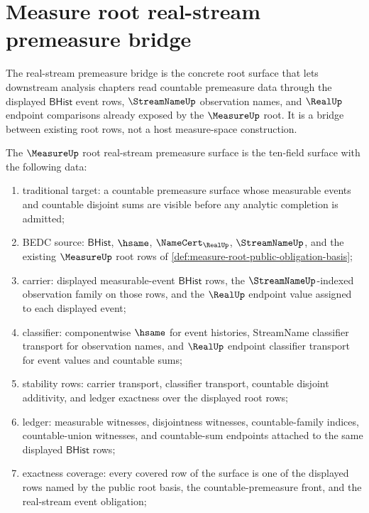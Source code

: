 \section{Measure root real-stream premeasure bridge}
\label{sec:measure-root-real-stream-premeasure-bridge}

The real-stream premeasure bridge is the concrete root surface that lets
downstream analysis chapters read countable premeasure data through the
displayed $\mathsf{BHist}$ event rows, $\StreamNameUp$ observation names, and
$\RealUp$ endpoint comparisons already exposed by the $\MeasureUp$ root. It is
a bridge between existing root rows, not a host measure-space construction.

\begin{definition}
\label{def:measure-root-real-stream-premeasure-surface}
The $\MeasureUp$ root real-stream premeasure surface is the ten-field surface
with the following data:
\begin{enumerate}
  \item traditional target: a countable premeasure surface whose measurable
  events and countable disjoint sums are visible before any analytic
  completion is admitted;
  \item BEDC source: $\mathsf{BHist}$, $\hsame$,
  $\NameCert_{\RealUp}$, $\StreamNameUp$, and the existing $\MeasureUp$ root
  rows of \autoref{def:measure-root-public-obligation-basis};
  \item carrier: displayed measurable-event $\mathsf{BHist}$ rows, the
  $\StreamNameUp$-indexed observation family on those rows, and the
  $\RealUp$ endpoint value assigned to each displayed event;
  \item classifier: componentwise $\hsame$ for event histories, StreamName
  classifier transport for observation names, and $\RealUp$ endpoint
  classifier transport for event values and countable sums;
  \item stability rows: carrier transport, classifier transport, countable
  disjoint additivity, and ledger exactness over the displayed root rows;
  \item ledger: measurable witnesses, disjointness witnesses,
  countable-family indices, countable-union witnesses, and countable-sum
  endpoints attached to the same displayed $\mathsf{BHist}$ rows;
  \item exactness coverage: every covered row of the surface is one of the
  displayed rows named by the public root basis, the countable-premeasure
  front, and the real-stream event obligation;

\end{enumerate}
\end{definition}
